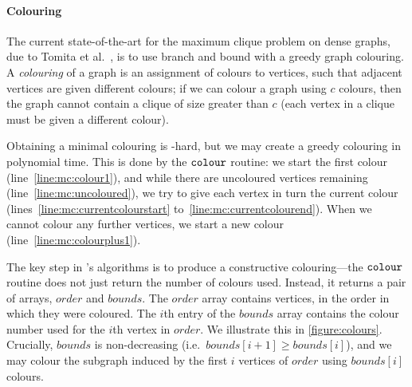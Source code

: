 \documentclass[letterpaper]{article}
\newcommand{\mcline}[1]{line~\ref{line:mc:#1}}
\newcommand{\mclinerange}[2]{lines~\ref{line:mc:#1} to~\ref{line:mc:#2}}
\newcommand{\bounds}{\mathit{bounds}}
\newcommand{\order}{\mathit{order}}
\newcommand{\colourOrder}{\FuncSty{colour}}
\begin{document}
\paragraph{Colouring}

The current state-of-the-art for the maximum clique problem on dense graphs, due to Tomita et al.\
\cite{Tomita:2007,Tomita:2010}, is to use branch and bound with a greedy graph
colouring.  A \emph{colouring} of a graph is an assignment of colours to vertices, such that
adjacent vertices are given different colours; if we can colour a graph using $c$ colours, then the
graph cannot contain a clique of size greater than $c$ (each vertex in a clique must be given a
different colour).

Obtaining a minimal colouring is \NP-hard, but we may create a greedy colouring in polynomial time.
This is done by the $\colourOrder$ routine: we start the first colour (\mcline{colour1}), and while
there are uncoloured vertices remaining (\mcline{uncoloured}), we try to give each vertex in turn
the current colour (\mclinerange{currentcolourstart}{currentcolourend}).  When we cannot colour any
further vertices, we start a new colour (\mcline{colourplus1}).

The key step in \citeauthor{Tomita:2010}'s algorithms is to produce a constructive colouring---the
$\colourOrder$ routine does not just return the number of colours used. Instead, it returns a pair
of arrays, $\order$ and $\bounds$. The $\order$ array contains vertices, in the order in which they
were coloured. The $i$th entry of the $\bounds$ array contains the colour number used for the $i$th
vertex in $\order$. We illustrate this in \cref{figure:colours}. Crucially, $\bounds$ is
non-decreasing (i.e.\ $\bounds[i+1] \ge \bounds[i]$), and we may colour the subgraph induced by the
first $i$ vertices of $\order$ using $\bounds[i]$ colours.
\end{document}

